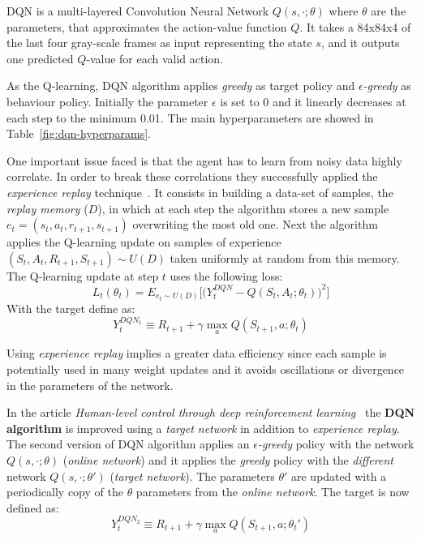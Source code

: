 DQN is a multi-layered Convolution Neural Network $Q(s, \cdotp; \theta)$ %
where $\theta$ are the parameters, that approximates the action-value function $Q$. It takes a 84x84x4 of the last four gray-scale frames as input representing the state $s$, and it outputs one predicted $Q$-value for each valid action.  

As the Q-learning, DQN algorithm applies \textit{greedy} as target policy and \textit{$\epsilon$-greedy} as behaviour policy. Initially the parameter $\epsilon$ is set to 0 and it linearly decreases at each step to the minimum 0.01. The main hyperparameters are showed in Table~\ref{fig:dqn-hyperparams}.

One important issue faced is that the agent has to learn from noisy data highly correlate. In order to break these correlations they successfully applied the \textit{experience replay} technique~\cite{Lin:1992:RLR:168871}. It consists in building a data-set of samples, the \textit{replay memory} ($D$), in which at each step the algorithm stores a new sample $e_t = (s_t, a_t, r_{t+1}, s_{t+1})$ overwriting the most old one. Next the algorithm applies the Q-learning update on samples of experience $(S_t, A_t, R_{t+1}, S_{t+1}) \sim U(D)$ taken uniformly at random from this memory. The Q-learning update at step $t$ uses the following loss:
\begin{equation}
	L_t(\theta_t) = E_{e_t \sim U(D)} %
		\Big[ \Big( Y^{DQN}_t - Q(S_t, A_t;\theta_t) \Big)^2 \Big]
\end{equation}
With the target define as:
\begin{equation}
Y^{DQN_1}_t \equiv R_{t+1} + \gamma \max_{a} Q(S_{t+1}, a; \theta_t)
\end{equation}

Using \textit{experience replay} implies a greater data efficiency since each sample is potentially used in many weight updates and it avoids oscillations or divergence in the parameters of the network.


In the article \textit{Human-level control through deep reinforcement learning}~\cite{Mnih2015} the \textbf{DQN algorithm} is improved using a \textit{target network} in addition to \textit{experience replay}.
The second version of DQN algorithm applies an \textit{$\epsilon$-greedy} policy with the network $Q(s, \cdotp; \theta)$ (\textit{online network}) and it applies the \textit{greedy} policy with the \emph{different} network $Q(s, \cdotp; \theta')$ (\textit{target network}). The parameters $\theta'$ are updated with a periodically copy of the $\theta$ parameters from the \textit{online network}. The target is now defined as:
\begin{equation}
Y^{DQN_2}_t \equiv R_{t+1} + \gamma \max_{a} Q(S_{t+1}, a; \theta_t')
\end{equation}

